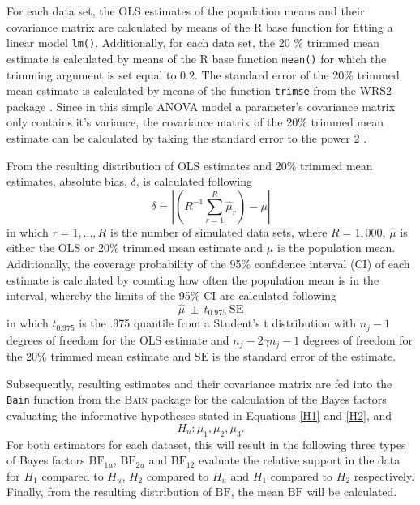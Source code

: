 \documentclass[11pt, a4paper]{article}
\begin{document}
For each data set, the OLS estimates of the population means and their covariance matrix are calculated by means of the R base function for fitting a linear model \texttt{lm()}. Additionally, for each data set, the 20 \% trimmed mean estimate is calculated by means of the R base function \texttt{mean()} for which the trimming argument is set equal to $0.2$. The standard error of the 20\% trimmed mean estimate is calculated by means of the function \texttt{trimse} from the \textsc{WRS2} package \citep*{WRS2}. 
Since in this simple ANOVA model a parameter's covariance matrix only contains it's variance, the covariance matrix of the 20\% trimmed mean estimate can be calculated by taking the standard error to the power $2$ \citep[p.60-64]{Wilcox2017}.

From the resulting distribution of OLS estimates and 20\% trimmed mean estimates, absolute bias, $\delta$, is calculated following
\begin{equation}
\delta = |(R^{-1}\sum\limits_{r=1}^{R} \hat{\mu}_r) -\mu|
\end{equation}
in which $r = 1, ..., R$ is the number of simulated data sets, where $R = 1,000$, $\hat{\mu}$ is either the OLS or 20\% trimmed mean estimate and $\mu$ is the population mean. 
Additionally, the coverage probability of the 95\% confidence interval (CI) of each estimate is calculated by counting how often the population mean is in the interval, whereby the limits of the 95\% CI are calculated following
\begin{equation}
\hat{\mu} \ \pm \ t_{0.975} \ \mathrm{SE}
\end{equation}
in which $t_{0.975}$ is the .975 quantile from a Student's t distribution with $n_j-1$ degrees of freedom for the OLS estimate and $n_j-2 \gamma n_j-1$ degrees of freedom for the 20\% trimmed mean estimate \citep[pp.~115-119]{Wilcox2017} and $\mathrm{SE}$ is the standard error of the estimate.

Subsequently, resulting estimates and their covariance matrix are fed into the \texttt{Bain} function from the \textsc{Bain} package for the calculation of the Bayes factors evaluating the informative hypotheses stated in Equations \ref{H1} and \ref{H2}, and 
\begin{equation}
H_u: \mu_1, \mu_2, \mu_3.
\label{Hu}
\end{equation}
For both estimators for each dataset, this will result in the following three types of Bayes factors
$\mathrm{BF}_{1u}$, $\mathrm{BF}_{2u}$ and $\mathrm{BF}_{12}$ evaluate the relative support in the data for $H_1$ compared to $H_u$, $H_2$ compared to $H_u$ and $H_1$ compared to $H_2$ respectively. 
Finally, from the resulting distribution of $\mathrm{BF}$, the mean $\mathrm{BF}$ will be calculated. 
\end{document}
